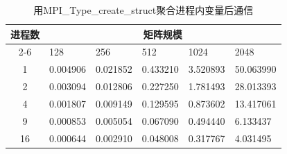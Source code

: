 \documentclass{SYSUReport}
\begin{document}
\begin{table}[H]
\centering
\label{表2}
\begin{tabular}{|c|lllll|}
\hline
\multirow{2}{*}{进程数} & \multicolumn{5}{c|}{矩阵规模}                                                                        \\ \cline{2-6} 
 & \multicolumn{1}{l|}{128} & \multicolumn{1}{l|}{256} & \multicolumn{1}{l|}{512} & \multicolumn{1}{l|}{1024} & 2048 \\ \hline
1                    & \multicolumn{1}{l|}{0.004906} & \multicolumn{1}{l|}{0.021852} & \multicolumn{1}{l|}{0.433210} & \multicolumn{1}{l|}{3.520893} & 50.063990 \\ \hline
2                    & \multicolumn{1}{l|}{0.003094} & \multicolumn{1}{l|}{0.012806} & \multicolumn{1}{l|}{0.227250} & \multicolumn{1}{l|}{1.781493} & 28.013393 \\ \hline
4                    & \multicolumn{1}{l|}{0.001807} & \multicolumn{1}{l|}{0.009149} & \multicolumn{1}{l|}{0.129595} & \multicolumn{1}{l|}{0.873602} & 13.417061 \\ \hline
9                    & \multicolumn{1}{l|}{0.000853} & \multicolumn{1}{l|}{0.005054} & \multicolumn{1}{l|}{0.067090} & \multicolumn{1}{l|}{0.494440} & 6.133437 \\ \hline
16                   & \multicolumn{1}{l|}{0.000644} & \multicolumn{1}{l|}{0.002910} & \multicolumn{1}{l|}{0.048008} & \multicolumn{1}{l|}{0.317767} & 4.031495 \\ \hline
\end{tabular}
\caption{用MPI\_Type\_create\_struct聚合进程内变量后通信}
\end{table}
\end{document}
